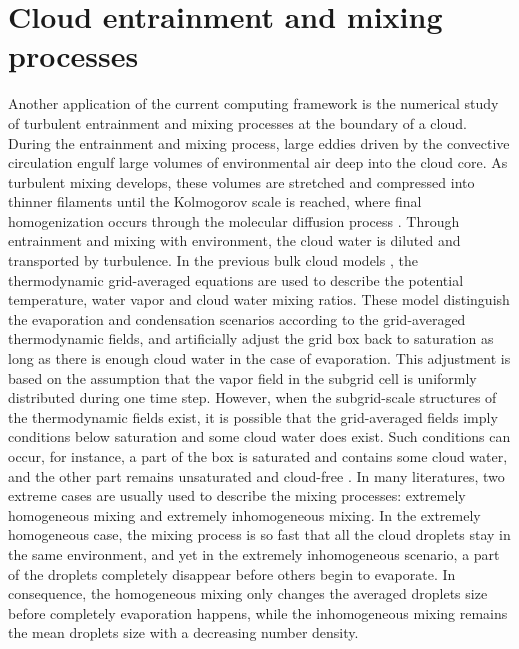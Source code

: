 \section{Cloud entrainment and mixing processes}
Another application of the current computing framework is the numerical study 
of turbulent entrainment and mixing processes at the boundary of a cloud. During the entrainment and mixing process, large eddies driven by the convective circulation engulf large volumes of environmental air deep into the cloud core. As turbulent mixing develops, these volumes are stretched and compressed into thinner filaments until the Kolmogorov scale is reached, where final homogenization occurs through the molecular diffusion process \cite{Burnet2007Observational}. Through entrainment and mixing with environment, the cloud water is diluted and transported by turbulence. In the previous bulk cloud models \cite{Grabowski1990}, the thermodynamic grid-averaged equations are used to describe the potential temperature, water vapor and cloud water mixing ratios. These model distinguish the evaporation and condensation scenarios according to the grid-averaged thermodynamic fields, and artificially adjust the grid box back to saturation as long as there is enough cloud water in the case of evaporation. This adjustment is based on the assumption that the vapor field in the subgrid cell is uniformly distributed during one time step. However, when the subgrid-scale structures of the thermodynamic fields exist, it is possible that the grid-averaged fields imply conditions below saturation and some cloud water does exist. Such conditions can occur, for instance, a part of the box is saturated and contains some cloud water, and the other part remains unsaturated and cloud-free \cite{Grabowski2007}. In many literatures\cite{Baker1980, Burnet2007, Lehmann2009}, two extreme cases are usually used to describe the mixing processes: extremely homogeneous mixing and extremely inhomogeneous mixing. In the extremely homogeneous case, the mixing process is so fast that all the cloud droplets stay in the same environment, and yet in the extremely inhomogeneous scenario, a part of the droplets completely disappear before others begin to evaporate. In consequence, the homogeneous mixing only changes the averaged droplets size before completely evaporation happens, while the inhomogeneous mixing remains the mean droplets size with a decreasing number density.

